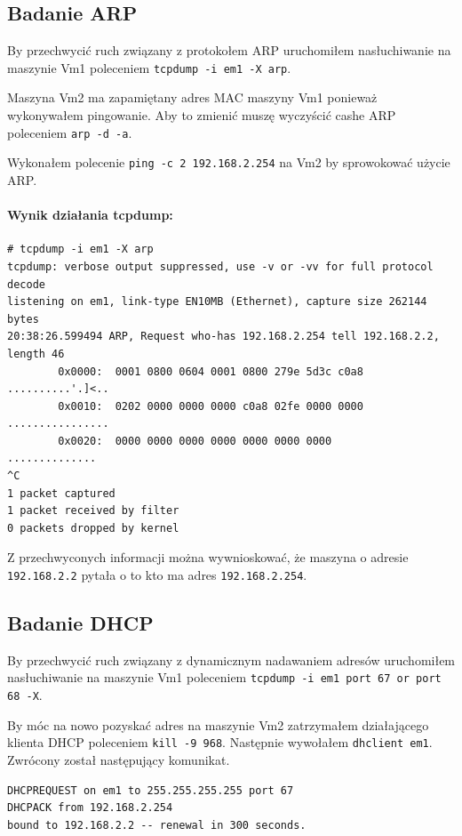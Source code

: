 \documentclass{mwart} %
\begin{document}
\subsection{Badanie ARP}
By przechwycić ruch związany z protokołem ARP uruchomiłem nasłuchiwanie na maszynie Vm1 poleceniem \texttt{tcpdump -i em1 -X arp}.

Maszyna Vm2 ma zapamiętany adres MAC maszyny Vm1 ponieważ wykonywałem pingowanie. Aby to zmienić muszę wyczyścić cashe ARP poleceniem \texttt{arp -d -a}.

Wykonałem polecenie \texttt{ping -c 2 192.168.2.254} na Vm2 by sprowokować użycie ARP.

\paragraph{Wynik działania tcpdump:}
\begin{verbatim}
# tcpdump -i em1 -X arp
tcpdump: verbose output suppressed, use -v or -vv for full protocol decode
listening on em1, link-type EN10MB (Ethernet), capture size 262144 bytes
20:38:26.599494 ARP, Request who-has 192.168.2.254 tell 192.168.2.2, length 46
        0x0000:  0001 0800 0604 0001 0800 279e 5d3c c0a8  ..........'.]<..
        0x0010:  0202 0000 0000 0000 c0a8 02fe 0000 0000  ................
        0x0020:  0000 0000 0000 0000 0000 0000 0000       ..............
^C
1 packet captured
1 packet received by filter
0 packets dropped by kernel
\end{verbatim}

Z przechwyconych informacji można wywnioskować, że maszyna o adresie \texttt{192.168.2.2} pytała o to kto ma adres \texttt{192.168.2.254}.

\subsection{Badanie DHCP}
By przechwycić ruch związany z dynamicznym nadawaniem adresów uruchomiłem nasłuchiwanie na maszynie Vm1 poleceniem \texttt{tcpdump -i em1 port 67 or port 68 -X}.

By móc na nowo pozyskać adres na maszynie Vm2 zatrzymałem działającego klienta DHCP poleceniem \texttt{kill -9 968}. Następnie wywołałem \texttt{dhclient em1}. Zwrócony został następujący komunikat.
\begin{verbatim}
DHCPREQUEST on em1 to 255.255.255.255 port 67
DHCPACK from 192.168.2.254
bound to 192.168.2.2 -- renewal in 300 seconds.
\end{verbatim}
\end{document}
